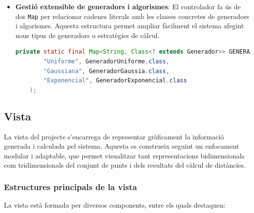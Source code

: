 \documentclass{ieeetj}
\begin{document}
\begin{itemize}
\begin{itemize}
    \item \textbf{Gestió extensible de generadors i algorismes}: El controlador fa ús de dos \texttt{Map} per relacionar cadenes literals amb les classes concretes de generadors i algorismes. Aquesta estructura permet ampliar fàcilment el sistema afegint nous tipus de generadors o estratègies de càlcul.

    \begin{lstlisting}[language=java]
    private static final Map<String, Class<? extends Generador>> GENERADORS = Map.of(
        "Uniforme", GeneradorUniforme.class,
        "Gaussiana", GeneradorGaussia.class,
        "Exponencial", GeneradorExponencial.class
    );
    \end{lstlisting}
\end{itemize}
\end{itemize}

\subsection{Vista}

La vista del projecte s'encarrega de representar gràficament la informació generada i calculada pel sistema. Aquesta es construeix seguint un enfocament modular i adaptable, que permet visualitzar tant representacions bidimensionals com tridimensionals del conjunt de punts i dels resultats del càlcul de distàncies.

\subsubsection*{Estructures principals de la vista}

La vista està formada per diversos components, entre els quals destaquen:
\end{document}
